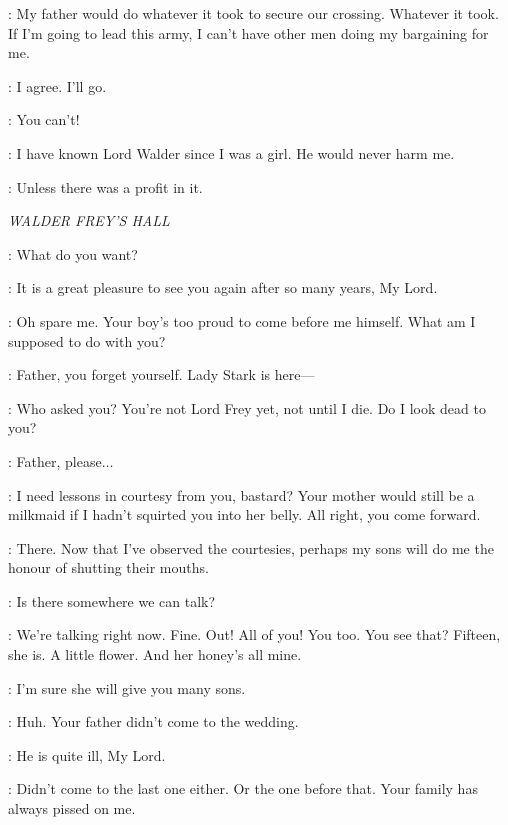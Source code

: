 \ROBB: My father would do whatever it took to secure our crossing. Whatever it took. If I'm going to lead this army, I can't have other men doing my bargaining for me. 

\CATELYN: I agree. I'll go. 

\THEON: You can't! 

\CATELYN: I have known Lord Walder since I was a girl. He would never harm me. 

\UMBER: Unless there was a profit in it. 


\scene

\textit{WALDER FREY'S HALL} 


\FREY: What do you want? 

\CATELYN: It is a great pleasure to see you again after so many years, My Lord. 

\FREY: Oh spare me. Your boy's too proud to come before me himself. What am I supposed to do with you? 

\STEVRONFREY: Father, you forget yourself. Lady Stark is here--- 

\FREY: Who asked you? You're not Lord Frey yet, not until I die. Do I look dead to you? 

\WALDERRIVERS: Father, please$\ldots$  

\FREY: I need lessons in courtesy from you, bastard? Your mother would still be a milkmaid if I hadn't squirted you into her belly. All right, you come forward. 


\FREY: There. Now that I've observed the courtesies, perhaps my sons will do me the honour of shutting their mouths. 

\CATELYN: Is there somewhere we can talk? 

\FREY: We're talking right now.  Fine. Out! All of you!  You too.  You see that? Fifteen, she is. A little flower. And her honey's all mine. 

\CATELYN: I'm sure she will give you many sons. 

\FREY: Huh. Your father didn't come to the wedding. 

\CATELYN: He is quite ill, My Lord. 

\FREY: Didn't come to the last one either. Or the one before that. Your family has always pissed on me. 

